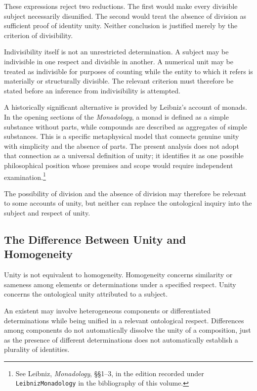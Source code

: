 These expressions reject two reductions.
The first would make every divisible subject
necessarily disunified. The second would
treat the absence of division as sufficient
proof of identity unity. Neither conclusion
is justified merely by the criterion of
divisibility.

Indivisibility itself is not an unrestricted
determination. A subject may be indivisible
in one respect and divisible in another.
A numerical unit may be treated as indivisible
for purposes of counting while the entity
to which it refers is materially or structurally
divisible. The relevant criterion must
therefore be stated before an inference
from indivisibility is attempted.

A historically significant alternative is
provided by Leibniz's account of monads.
In the opening sections of the \textit{Monadology},
a monad is defined as a simple substance without
parts, while compounds are described as
aggregates of simple substances. This is a
specific metaphysical model that connects
genuine unity with simplicity and the absence
of parts. The present analysis does not adopt
that connection as a universal definition
of unity; it identifies it as one possible
philosophical position whose premises and
scope would require independent examination.\footnote{See Leibniz, \textit{Monadology}, §§1--3, in the edition recorded under \texttt{LeibnizMonadology} in the bibliography of this volume.}

The possibility of division and the absence
of division may therefore be relevant to
some accounts of unity, but neither can
replace the ontological inquiry into the
subject and respect of unity.

\subsection{The Difference Between Unity and Homogeneity}

Unity is not equivalent to homogeneity.
Homogeneity concerns similarity or sameness
among elements or determinations under
a specified respect. Unity concerns the
ontological unity attributed to a subject.

An existent may involve heterogeneous
components or differentiated determinations
while being unified in a relevant ontological
respect. Differences among components do
not automatically dissolve the unity of
a composition, just as the presence of
different determinations does not automatically
establish a plurality of identities.

